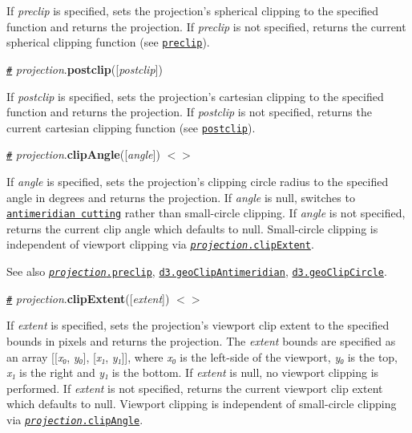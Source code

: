 If {\itshape preclip} is specified, sets the projection’s spherical clipping to the specified function and returns the projection. If {\itshape preclip} is not specified, returns the current spherical clipping function (see \href{#preclip}{\tt preclip}).

\href{#projection_postclip}{\tt \#} {\itshape projection}.{\bfseries postclip}(\mbox{[}{\itshape postclip}\mbox{]})

If {\itshape postclip} is specified, sets the projection’s cartesian clipping to the specified function and returns the projection. If {\itshape postclip} is not specified, returns the current cartesian clipping function (see \href{#postclip}{\tt postclip}).

\href{#projection_clipAngle}{\tt \#} {\itshape projection}.{\bfseries clip\+Angle}(\mbox{[}{\itshape angle}\mbox{]}) \href{https://github.com/d3/d3-geo/blob/master/src/projection/index.js#L52}{\tt $<$$>$}

If {\itshape angle} is specified, sets the projection’s clipping circle radius to the specified angle in degrees and returns the projection. If {\itshape angle} is null, switches to \href{https://bl.ocks.org/mbostock/3788999}{\tt antimeridian cutting} rather than small-\/circle clipping. If {\itshape angle} is not specified, returns the current clip angle which defaults to null. Small-\/circle clipping is independent of viewport clipping via \href{#projection_clipExtent}{\tt {\itshape projection}.clip\+Extent}.

See also \href{#projection_preclip}{\tt {\itshape projection}.preclip}, \href{#geoClipAntimeridian}{\tt d3.\+geo\+Clip\+Antimeridian}, \href{#geoClipCircle}{\tt d3.\+geo\+Clip\+Circle}.

\href{#projection_clipExtent}{\tt \#} {\itshape projection}.{\bfseries clip\+Extent}(\mbox{[}{\itshape extent}\mbox{]}) \href{https://github.com/d3/d3-geo/blob/master/src/projection/index.js#L56}{\tt $<$$>$}

If {\itshape extent} is specified, sets the projection’s viewport clip extent to the specified bounds in pixels and returns the projection. The {\itshape extent} bounds are specified as an array \mbox{[}\mbox{[}{\itshape x₀}, {\itshape y₀}\mbox{]}, \mbox{[}{\itshape x₁}, {\itshape y₁}\mbox{]}\mbox{]}, where {\itshape x₀} is the left-\/side of the viewport, {\itshape y₀} is the top, {\itshape x₁} is the right and {\itshape y₁} is the bottom. If {\itshape extent} is null, no viewport clipping is performed. If {\itshape extent} is not specified, returns the current viewport clip extent which defaults to null. Viewport clipping is independent of small-\/circle clipping via \href{#projection_clipAngle}{\tt {\itshape projection}.clip\+Angle}.

